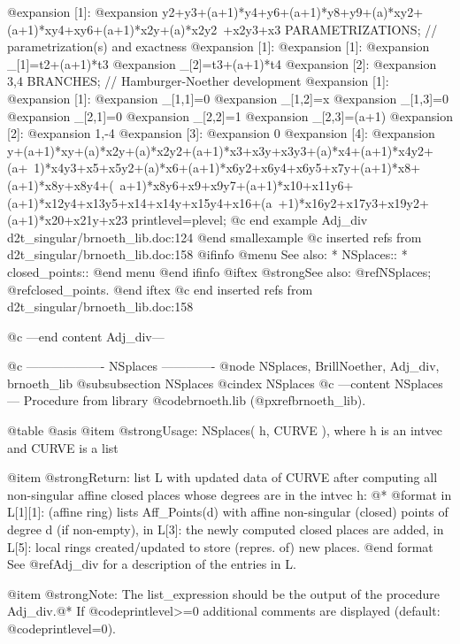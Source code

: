 @expansion{} [1]:
@expansion{}    y2+y3+(a+1)*y4+y6+(a+1)*y8+y9+(a)*xy2+(a+1)*xy4+xy6+(a+1)*x2y+(a)*x2y2\
   +x2y3+x3
PARAMETRIZATIONS;      // parametrization(s) and exactness
@expansion{} [1]:
@expansion{}    [1]:
@expansion{}       _[1]=t2+(a+1)*t3
@expansion{}       _[2]=t3+(a+1)*t4
@expansion{}    [2]:
@expansion{}       3,4
BRANCHES;              // Hamburger-Noether development
@expansion{} [1]:
@expansion{}    [1]:
@expansion{}       _[1,1]=0
@expansion{}       _[1,2]=x
@expansion{}       _[1,3]=0
@expansion{}       _[2,1]=0
@expansion{}       _[2,2]=1
@expansion{}       _[2,3]=(a+1)
@expansion{}    [2]:
@expansion{}       1,-4
@expansion{}    [3]:
@expansion{}       0
@expansion{}    [4]:
@expansion{}       y+(a+1)*xy+(a)*x2y+(a)*x2y2+(a+1)*x3+x3y+x3y3+(a)*x4+(a+1)*x4y2+(a+\
   1)*x4y3+x5+x5y2+(a)*x6+(a+1)*x6y2+x6y4+x6y5+x7y+(a+1)*x8+(a+1)*x8y+x8y4+(\
   a+1)*x8y6+x9+x9y7+(a+1)*x10+x11y6+(a+1)*x12y4+x13y5+x14+x14y+x15y4+x16+(a\
   +1)*x16y2+x17y3+x19y2+(a+1)*x20+x21y+x23
printlevel=plevel;
@c end example Adj_div d2t_singular/brnoeth_lib.doc:124
@end smallexample
@c inserted refs from d2t_singular/brnoeth_lib.doc:158
@ifinfo
@menu
See also:
* NSplaces::
* closed_points::
@end menu
@end ifinfo
@iftex
@strong{See also:}
@ref{NSplaces};
@ref{closed_points}.
@end iftex
@c end inserted refs from d2t_singular/brnoeth_lib.doc:158

@c ---end content Adj_div---

@c ------------------- NSplaces -------------
@node NSplaces, BrillNoether, Adj_div, brnoeth_lib
@subsubsection NSplaces
@cindex NSplaces
@c ---content NSplaces---
Procedure from library @code{brnoeth.lib} (@pxref{brnoeth_lib}).

@table @asis
@item @strong{Usage:}
NSplaces( h, CURVE ), where h is an intvec and CURVE is a list

@item @strong{Return:}
list L with updated data of CURVE after computing all non-singular
affine closed places whose degrees are in the intvec h: @*
   @format
   in L[1][1]: (affine ring) lists Aff_Points(d) with affine non-singular
               (closed) points of degree d (if non-empty),
   in L[3]:    the newly computed closed places are added,
   in L[5]:    local rings created/updated to store (repres. of) new places.
   @end format
See @ref{Adj_div} for a description of the entries in L.

@item @strong{Note:}
The list_expression should be the output of the procedure Adj_div.@*
If @code{printlevel>=0} additional comments are displayed (default:
@code{printlevel=0}).

